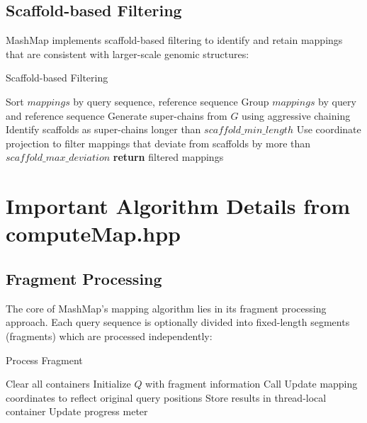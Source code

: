 \documentclass{article}
\begin{document}
\subsection{Scaffold-based Filtering}

MashMap implements scaffold-based filtering to identify and retain mappings that are consistent with larger-scale genomic structures:

\begin{algorithm}
\caption{Scaffold-based Filtering}
\begin{algorithmic}[1]
\State Sort $mappings$ by query sequence, reference sequence
\State Group $mappings$ by query and reference sequence
    \State Generate super-chains from $G$ using aggressive chaining
    \State Identify scaffolds as super-chains longer than $scaffold\_min\_length$
    \State Use coordinate projection to filter mappings that deviate from scaffolds by more than $scaffold\_max\_deviation$
\EndFor
\State \textbf{return} filtered mappings
\EndProcedure
\end{algorithmic}
\end{algorithm}

\section{Important Algorithm Details from computeMap.hpp}

\subsection{Fragment Processing}

The core of MashMap's mapping algorithm lies in its fragment processing approach. Each query sequence is optionally divided into fixed-length segments (fragments) which are processed independently:

\begin{algorithm}
\caption{Process Fragment}
\begin{algorithmic}[1]
\State Clear all containers
\State Initialize $Q$ with fragment information
\State Call 
\State Update mapping coordinates to reflect original query positions
\State Store results in thread-local container
\State Update progress meter
\EndProcedure
\end{algorithmic}
\end{algorithm}
\end{document}
